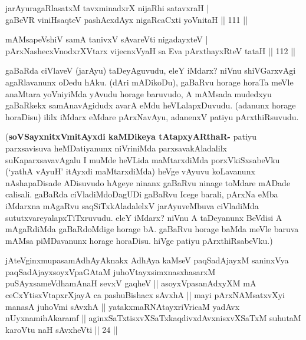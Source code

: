 
\begin{shl}
jarAyuragaRlasatxM tavxminadxrX nijaRhi satavxraH | \\
gaBeVR viniHsaqteV pashAcxdAyx nigaRcaCxti yoVnitaH \hfill|| 111 || 
\end{shl}

\begin{shl}
mAMsapeVshiV samA tanivxV sA\s vareVti nigadayxteV | \\
pArxNashecxVnodxrXV\s tarx vijecnxVyaH sa Eva pArxthayxRteV tataH \hfill|| 112 || 
\end{shl}

\begin{artha}
gaBaRda ciVlaveV (jarAyu) taDeyAguvudu, eleY iMdarx? niVnu shiVGarxvAgi 
agaRlavanunx oDedu hAku. (dAri mADikoDu), gaBaRvu horage horaTa meVle 
anaMtara yoVniyiMda yAvudu horage baruvudo, A mAMsada mudedxyu 
gaBaRkekx samAnavAgidudx avarA eMdu heVLalapxDuvudu. (adanunx horage 
horaDisu) ililx iMdarx eMdare pArxNavAyu, adanenxV patiyu 
pArxthiRsuvudu.

(\textbf{soVSayxnitxVmitAyxdi kaMDikeya tAtapxyARthaR-} patiyu 
parxsavisuva heMDati\-yanunx niVriniMda parxsavakAladalilx 
suKaparxsavavAgalu I muMde heVLida maMtarxdiMda porxVkiSxsabeVku 
(`yathA vAyuH' itAyxdi maMtarxdiMda) heVge vAyuvu koLavanunx 
nAshapaDisade ADisuvudo hAgeye ninanx gaBaRvu ninage toMdare mADade 
calisali. gaBaRda ciVladiMdoDagUDi gaBaRvu Icege barali, pArxNa eMba 
iMdarxna mAgaRvu saqSiTxkAladalelxV jarAyuveMbuva ciVladiMda 
sututxvareyalapxTiTxruvudu. eleY iMdarx? niVnu A taDeyanunx BeVdisi A 
mAgaRdiMda gaBaRdoMdige horage bA. gaBaRvu horage baMda meVle baruva 
mAMsa piMDavanunx horage horaDisu. hiVge patiyu pArxthiRsabeVku.)
\end{artha}


\begin{shl}
jAteV\s ginxmupasamAdhAyAknakx AdhAya kaMseV paqSadAjayxM saninxVya paqSadAjayxsoyxVpaGAtaM juhoVtayxsimxnasxhasarxM puSAyxsameVdhamAnaH sevxV gaqheV || asoyxVpasanAdxyXM mA ceCxYtisxVtapxrXjayA ca pashuBishacx sAvxhA || mayi pArxNAMsatxvXyi manasA juhoVmi sAvxhA || yatakxmaRNAtayxriVricaM yadAvx nUyxnamihAkaramf || aginxSaTxtisxvXSaTxkaqdivxdAvxnisxvXSaTxM suhutaM karoVtu naH sAvxheVti || 24 ||
\end{shl}


